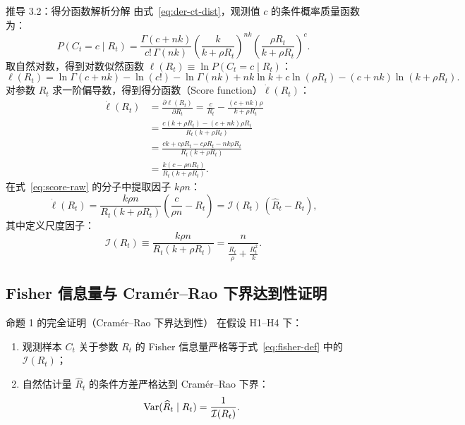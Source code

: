 \begin{derivationbox}{推导 3.2：得分函数解析分解}
由式~\eqref{eq:der-ct-dist}，观测值 $c$ 的条件概率质量函数为：
\begin{equation}
  P(C_t = c \mid R_t) = \frac{\Gamma(c + nk)}{c! \, \Gamma(nk)} \left( \frac{k}{k + \rho R_t} \right)^{nk} \left( \frac{\rho R_t}{k + \rho R_t} \right)^c.
\end{equation}
取自然对数，得到对数似然函数 $\ell(R_t) \equiv \ln P(C_t = c \mid R_t)$：
\begin{equation}
  \ell(R_t) = \ln\Gamma(c + nk) - \ln(c!) - \ln\Gamma(nk) + nk\ln k + c\ln(\rho R_t) - (c + nk)\ln(k + \rho R_t).
\end{equation}
对参数 $R_t$ 求一阶偏导数，得到得分函数（Score function）$\dot{\ell}(R_t)$：
\begin{align}
  \dot{\ell}(R_t) &= \frac{\partial \ell(R_t)}{\partial R_t} = \frac{c}{R_t} - \frac{(c + nk)\rho}{k + \rho R_t} \nonumber \\
  &= \frac{c(k + \rho R_t) - (c + nk)\rho R_t}{R_t(k + \rho R_t)} \nonumber \\
  &= \frac{ck + c\rho R_t - c\rho R_t - nk\rho R_t}{R_t(k + \rho R_t)} \nonumber \\
  &= \frac{k(c - \rho n R_t)}{R_t(k + \rho R_t)}.
  \label{eq:score-raw}
\end{align}
在式~\eqref{eq:score-raw} 的分子中提取因子 $k\rho n$：
\begin{equation}
  \dot{\ell}(R_t) = \frac{k\rho n}{R_t(k + \rho R_t)} \left( \frac{c}{\rho n} - R_t \right) = \mathcal{I}(R_t) \, (\widehat{R}_t - R_t),
  \label{eq:score-factorized}
\end{equation}
其中定义尺度因子：
\begin{equation}
  \mathcal{I}(R_t) \equiv \frac{k\rho n}{R_t(k + \rho R_t)} = \frac{n}{\frac{R_t}{\rho} + \frac{R_t^2}{k}}.
  \label{eq:fisher-def}
\end{equation}
\end{derivationbox}

\subsection{Fisher 信息量与 Cramér--Rao 下界达到性证明}

\begin{theorembox}{命题 1 的完全证明（Cramér--Rao 下界达到性）}
在假设 H1--H4 下：
\begin{enumerate}[label=(\alph*)]
  \item 观测样本 $C_t$ 关于参数 $R_t$ 的 Fisher 信息量严格等于式~\eqref{eq:fisher-def} 中的 $\mathcal{I}(R_t)$；
  \item 自然估计量 $\widehat{R}_t$ 的条件方差严格达到 Cramér--Rao 下界：
  \begin{equation}
    \mathrm{Var}(\widehat{R}_t \mid R_t) = \frac{1}{\mathcal{I}(R_t)}.
  \end{equation}
\end{enumerate}
\end{theorembox}

